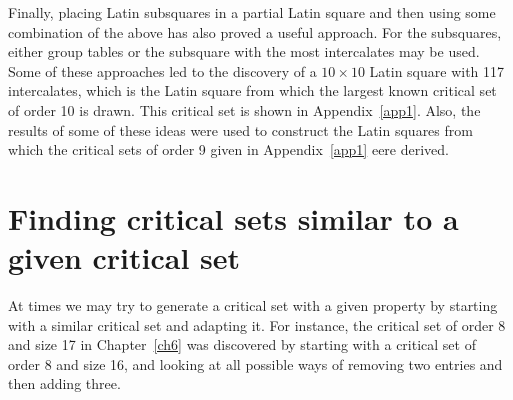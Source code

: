 \documentclass[12pt]{report}
\newtheorem{algorithm}{Algorithm}
\begin{document}
Finally, placing Latin subsquares in a partial Latin square and then 
using some combination of the above has also proved a useful approach.
For the subsquares, either group tables or the subsquare with the most 
intercalates may be used.  Some of these approaches led to the discovery
of a $10 \times 10$ Latin square with 117 intercalates, which is the
Latin square from which the largest known critical set of order 10
is drawn.  This critical set is shown in Appendix~\ref{app1}. Also, the results of
some of these ideas were used to construct the Latin squares from
which the critical sets of order 9 given in Appendix~\ref{app1} eere derived.

\section{Finding critical sets similar to a given critical set}
At times we may try to generate a critical set with a given property
by starting with a similar critical set and adapting it.  For instance,
the critical set of order 8 and size 17 in Chapter~\ref{ch6} was discovered by
starting with a critical set of order 8 and size 16, and looking at all
possible ways of removing two entries and then adding three.

%
\end{document}
